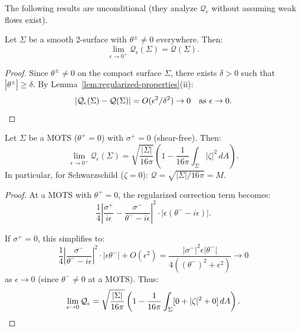 The following results are unconditional (they analyze $\mathcal{Q}_\epsilon$ without assuming weak flows exist).

\begin{theorem}
\label{thm:pointwise-convergence}
Let $\Sigma$ be a smooth 2-surface with $\theta^\pm \neq 0$ everywhere. Then:
\begin{equation}
\lim_{\epsilon \to 0^+} \mathcal{Q}_\epsilon(\Sigma) = \mathcal{Q}(\Sigma).
\end{equation}
\end{theorem}

\begin{proof}
Since $\theta^\pm \neq 0$ on the compact surface $\Sigma$, there exists $\delta > 0$ such that $|\theta^\pm| \geq \delta$. By Lemma~\ref{lem:regularized-properties}(ii):
\begin{equation}
|\mathcal{Q}_\epsilon(\Sigma) - \mathcal{Q}(\Sigma)| = O(\epsilon^2/\delta^2) \to 0 \quad \text{as } \epsilon \to 0. \qedhere
\end{equation}
\end{proof}

\begin{theorem}
\label{thm:shear-free-mots}
Let $\Sigma$ be a MOTS ($\theta^+ = 0$) with $\sigma^+ = 0$ (shear-free). Then:
\begin{equation}
\lim_{\epsilon \to 0^+} \mathcal{Q}_\epsilon(\Sigma) = \sqrt{\frac{|\Sigma|}{16\pi}}\left(1 - \frac{1}{16\pi}\int_\Sigma |\zeta|^2 \, dA\right).
\end{equation}
In particular, for Schwarzschild ($\zeta = 0$): $\mathcal{Q} = \sqrt{|\Sigma|/16\pi} = M$.
\end{theorem}

\begin{proof}
At a MOTS with $\theta^+ = 0$, the regularized correction term becomes:
\begin{equation}
\frac{1}{4}\left|\frac{\sigma^+}{i\epsilon} - \frac{\sigma^-}{\theta^- - i\epsilon}\right|^2 \cdot |\epsilon(\theta^- - i\epsilon)|.
\end{equation}

If $\sigma^+ = 0$, this simplifies to:
\begin{equation}
\frac{1}{4}\left|\frac{\sigma^-}{\theta^- - i\epsilon}\right|^2 \cdot |\epsilon\theta^-| + O(\epsilon^2) = \frac{|\sigma^-|^2 \epsilon |\theta^-|}{4((\theta^-)^2 + \epsilon^2)} \to 0
\end{equation}
as $\epsilon \to 0$ (since $\theta^- \neq 0$ at a MOTS). Thus:
\begin{equation}
\lim_{\epsilon \to 0} \mathcal{Q}_\epsilon = \sqrt{\frac{|\Sigma|}{16\pi}}\left(1 - \frac{1}{16\pi}\int_\Sigma [0 + |\zeta|^2 + 0] \, dA\right). \qedhere
\end{equation}
\end{proof}

